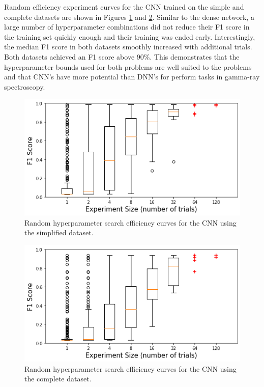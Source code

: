 Random efficiency experiment curves for the CNN trained on the simple and complete datasets are shown in Figures \ref{fig:random_hp_search_cnn_easy} and \ref{fig:random_hp_search_cnn_full}. Similar to the dense network, a large number of hyperparameter combinations did not reduce their F1 score in the training set quickly enough and their training was ended early. Interestingly, the median F1 score in both datasets smoothly increased with additional trials. Both datasets achieved an F1 score above 90$\%$. This demonstrates that the hyperparameter bounds used for both problems are well suited to the problems and that CNN's have more potential than DNN's for perform tasks in gamma-ray spectroscopy.

\begin{figure}[H]
	\centering
	\includegraphics[width=0.8\linewidth]{images/random_hp_search_cnn_easy}
	\caption{Random hyperparameter search efficiency curves for the CNN using the simplified dataset.}
	\label{fig:random_hp_search_cnn_easy}
\end{figure}

\begin{figure}[H]
	\centering
	\includegraphics[width=0.8\linewidth]{images/random_hp_search_cnn_full}
	\caption{Random hyperparameter search efficiency curves for the CNN using the complete dataset.}
	\label{fig:random_hp_search_cnn_full}
\end{figure}





